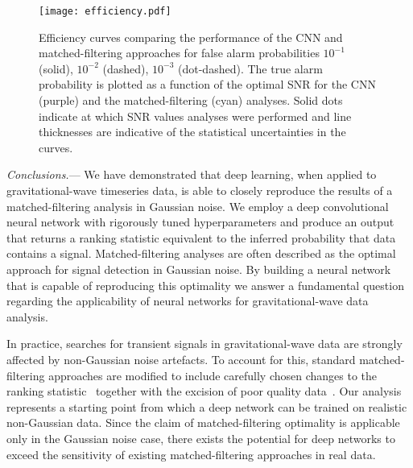\documentclass[%
showpacs,
 amsmath,amssymb,
 aps,
 twocolumn,
 prl,
 reprint,
floatfix,
]{revtex4-1}
\begin{document}
%
%
\begin{figure}[]
\texttt{[image: efficiency.pdf]}
\caption{Efficiency curves comparing the performance of the \ac{CNN} and
matched-filtering approaches for false alarm probabilities $10^{-1}$ (solid),
$10^{-2}$ (dashed), $10^{-3}$ (dot-dashed). The true alarm probability is
plotted as a function of the optimal \ac{SNR} for the \ac{CNN} (purple) and the
matched-filtering (cyan) analyses. Solid dots indicate at which \ac{SNR} values
analyses were performed and line thicknesses are indicative of the
statistical uncertainties in the curves.\label{fig:efficiency_curve}} 
\end{figure}

%
%
\textit{Conclusions.}--- 
%
%
We have demonstrated that deep learning, when applied to
gravitational-wave timeseries data, is able to closely reproduce the
results of a matched-filtering analysis in Gaussian noise. We employ a deep
convolutional neural network with rigorously tuned hyperparameters and produce
an output that returns a ranking statistic equivalent to the inferred
probability that data contains a signal. Matched-filtering analyses are often
described as the optimal approach for signal detection in Gaussian noise. By
building a neural network that is capable of reproducing this
optimality we answer a fundamental question regarding the applicability of
neural networks for gravitational-wave data analysis. 

%
%
In practice, searches for transient signals in gravitational-wave data are
strongly affected by non-Gaussian noise artefacts. To account for this,
standard matched-filtering approaches are modified to include carefully chosen
changes to the ranking statistic~\cite{PhysRevD.71.062001,0004-637X-849-2-118}
together with the excision of poor quality data~\cite{1710.02185,
0264-9381-33-13-134001}. Our analysis represents a starting point from which a
deep network can be trained on realistic non-Gaussian data. Since the claim of
matched-filtering optimality is applicable only in the Gaussian noise case,
there exists the potential for deep networks to exceed the sensitivity of
existing matched-filtering approaches in real data.
\end{document}

